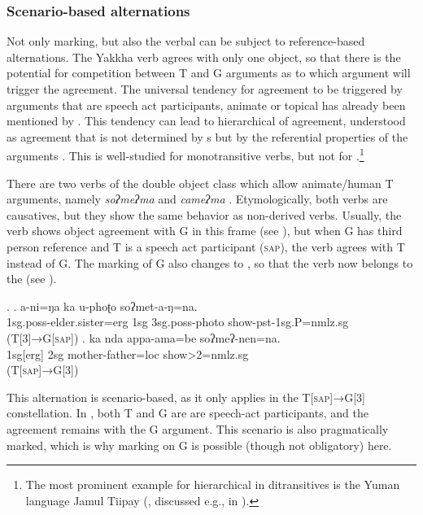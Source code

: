 	
\subsubsection{Scenario-based alternations}\label{scen-based}

Not only  marking, but also the verbal  can be subject to reference-based alternations. The Yakkha verb agrees with only one object, so that there is the potential for competition between T and G arguments as to which argument will trigger the agreement. The universal tendency for agreement to be triggered by arguments that are speech act participants, animate or topical has  already been mentioned by \citet{Givon1976Topic}. This tendency can lead to hierarchical  of agreement, understood as agreement that is not determined by s but by the referential properties of the arguments \citep[66]{Nichols1992Language}. This is well-studied for monotransitive verbs, but not for .\footnote{The most prominent example for hierarchical  in ditransitives is the Yuman language Jamul Tiipay (\citealt[162--163]{Miller2001A-grammar}, discussed e.g., in \citealt[348]{Siewierska2003Person}).} 
 
There are two verbs of the double object class which allow animate/human T arguments, namely  \emph{soʔmeʔma}  and \emph{cameʔma} . Etymologically, both verbs are causatives, but they show the same behavior as non-derived verbs. Usually, the verb shows object agreement with G in this frame (see \Next[a]), but when G has third person reference and T is a speech act participant (\textsc{sap}), the verb agrees with T instead of G.  The  marking of G also changes to , so that the verb now belongs to the  (see \Next[b]).

\ex. \ag. a-ni=ŋa  ka  u-phoʈo soʔmet-a-ŋ=na.\\
		{\sc 1sg.poss-}elder.sister{\sc =erg} {\sc 1sg} {\sc 3sg.poss-}photo  show{\sc -pst-1sg.P=nmlz.sg}\\
	 (T[3]→G[\textsc{sap}])
\bg. ka nda appa-ama=be soʔmeʔ-nen=na.\\
		 {\sc 1sg[erg]}  {\sc 2sg}  mother-father{\sc =loc} show{>2=nmlz.sg}\\
		 (T[\textsc{sap}]→G[3])
		
This alternation is scenario-based, as it only applies in the T[\textsc{sap}]→G[3] constellation. In \Next, both T and G are are speech-act participants, and the agreement remains with the G argument. This scenario is also pragmatically marked, which is why  marking on G is possible (though not obligatory) here.
	
